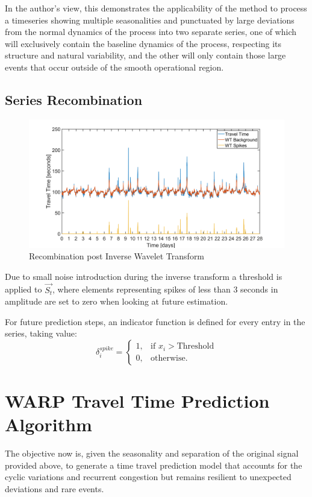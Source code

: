 \documentclass[a4paper, 10pt, conference]{ieeeconf}      %
\begin{document}
In the author's view, this demonstrates the applicability of the method to process a timeseries showing multiple seasonalities and punctuated by large deviations from the normal dynamics of the process into two separate series, one of which will exclusively contain the baseline dynamics of the process, respecting its structure and natural variability, and the other will only contain those large events that occur outside of the smooth operational region.
\subsection{Series Recombination}
\begin{figure}[htbp]
	\centerline{\includegraphics[width=\linewidth]{./images/Splitting.png}}
	\caption{Recombination post Inverse Wavelet Transform}
	\label{fig:splitting}
\end{figure}
Due to small noise introduction during the inverse transform a threshold is applied to $\vec{S_t}$, where elements representing spikes of less than 3 seconds in amplitude are set to zero when looking at future estimation.

For future prediction steps, an indicator function is defined for every entry in the series, taking value:
\begin{equation}
    \delta_i^{spike}=
    \begin{cases}
      1, & \text{if } x_i > \text{Threshold}\\
      0, & \text{otherwise.}
    \end{cases}
    \label{delta}
  \end{equation}
\section{WARP Travel Time Prediction Algorithm} \label{algorithm}
The objective now is, given the seasonality and separation of the original signal provided above, to generate a time travel prediction model that accounts for the cyclic variations and recurrent congestion but remains resilient to unexpected deviations and rare events.
\end{document}

